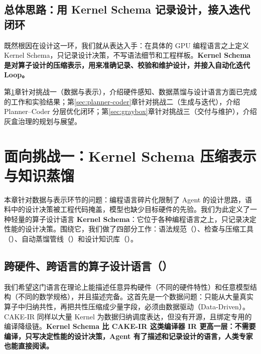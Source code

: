 \subsection{总体思路：用 Kernel Schema 记录设计，接入迭代闭环}\label{sec:overall-approach}
既然根因在设计这一环，我们就从表达入手：在具体的 GPU 编程语言之上定义 Kernel Schema，只记录设计决策，不写语法细节和工程样板。\textbf{Kernel Schema 是对算子设计的压缩表示，用来准确记录、校验和维护设计，并接入自动化迭代 Loop。}


\begin{DiagramBlock}
\end{DiagramBlock}
第\ref{sec:schema}章针对挑战一（数据与表示），介绍硬件感知、数据蒸馏与设计语言方面已完成的工作和实验结果；第\ref{sec:planner-coder}章针对挑战二（生成与迭代），介绍 Planner–Coder 分层优化闭环；第\ref{sec:graybox}章针对挑战三（交付与维护），介绍灰盒治理的规划与展望。


\SourceSeparator
\clearpage
\section{面向挑战一：Kernel Schema 压缩表示与知识蒸馏}\label{sec:schema}
本章针对数据与表示环节的问题：编程语言碎片化限制了 Agent 的设计思路，语料中的设计决策被工程代码掩盖，模型也缺少目标硬件的先验。我们为此定义了一种轻量的算子设计语言 \textbf{Kernel Schema}：它位于各种编程语言之上，只记录决定性能的设计决策。围绕它，我们做了四部分工作：语法规范（）、检查与压缩工具（）、自动蒸馏管线（）和设计知识库（）。


\begin{DiagramBlock}
\end{DiagramBlock}
\SourceSeparator
\subsection{跨硬件、跨语言的算子设计语言（）}\label{sec:schema-docs}
我们希望这门语言在理论上能描述任意异构硬件（不同的硬件特性）和任意模型结构（不同的数学规格），并且描述完备。这首先是一个数据问题：只能从大量真实算子中归纳共性，再把共性压缩成少量字段，必须由数据驱动（Data-Driven）。CAKE-IR 同样以大量 Kernel 为数据归纳调度表达，但没有开源，且绑定专用的编译降级链。\textbf{Kernel Schema 比 CAKE-IR 这类编译器 IR 更高一层：不需要编译，只写决定性能的设计决策，Agent 有了描述和记录设计的语言，人类专家也能直接阅读。}


